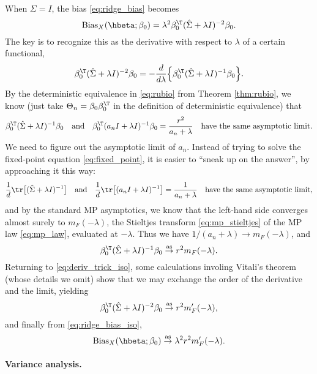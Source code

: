 \documentclass{article}
\begin{document}
When $\Sigma = I$, the bias \eqref{eq:ridge_bias} becomes 
\begin{equation}
\label{eq:ridge_bias_iso}
\Bias_X(\hbeta; \beta_0) = \lambda^2 \beta_0^\T (\hSigma + \lambda I)^{-2}
\beta_0.  
\end{equation}
The key is to recognize this as the derivative with respect to $\lambda$ of a
certain functional,
\begin{equation}
\label{eq:deriv_trick_iso}
\beta_0^\T (\hSigma + \lambda I)^{-2} \beta_0 = - \frac{d}{d\lambda} \Big \{
\beta_0^\T (\hSigma + \lambda I)^{-1} \beta_0 \Big\}.
\end{equation}
By the deterministic equivalence in \eqref{eq:rubio} from Theorem
\ref{thm:rubio}, we know (just take $\Theta_n = \beta_0\beta_0^\T$ in the 
definition of deterministic equivalence) that   
\[
\beta_0^\T (\hSigma + \lambda I)^{-1} \beta_0 \quad \text{and} \quad 
\beta_0^\T (a_n I + \lambda I)^{-1} \beta_0 = \frac{r^2}{a_n + \lambda} \quad
\text{have the same asymptotic limit}. 
\]
We need to figure out the asymptotic limit of $a_n$. Instead of trying to
solve the fixed-point equation \eqref{eq:fixed_point}, it is easier to ``sneak
up on the answer'', by approaching it this way:
\[
\frac{1}{d} \tr \big[ (\hSigma + \lambda I)^{-1} \big] \quad \text{and} \quad 
\frac{1}{d} \tr \big[ (a_n I + \lambda I)^{-1} \big] = \frac{1}{a_n + \lambda}
\quad \text{have the same asymptotic limit},  
\]
and by the standard MP asymptotics, we know that the left-hand side converges
almost surely to $m_F(-\lambda)$, the Stieltjes transform
\eqref{eq:mp_stieltjes} of the MP law \eqref{eq:mp_law}, evaluated at
$-\lambda$. Thus we have $1/(a_n + \lambda) \to m_F(-\lambda)$, and 
\[
\beta_0^\T (\hSigma + \lambda I)^{-1} \beta_0 \asto r^2 m_F(-\lambda).
\]
Returning to \eqref{eq:deriv_trick_iso}, some calculations involing Vitali's
theorem (whose details we omit) show that we may exchange the order of the 
derivative and the limit, yielding 
\[
\beta_0^\T (\hSigma + \lambda I)^{-2} \beta_0 \asto r^2 m'_F(-\lambda), 
\]
and finally from \eqref{eq:ridge_bias_iso}, 
\begin{equation}
\label{eq:ridge_bias_iso_limit}
\Bias_X(\hbeta; \beta_0) \asto \lambda^2 r^2 m'_F(-\lambda).
\end{equation}

\paragraph{Variance analysis.}
\end{document}
